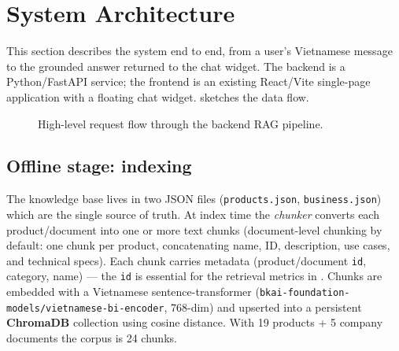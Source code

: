 \section{System Architecture}
\label{sec:architecture}

This section describes the system end to end, from a user's Vietnamese message
to the grounded answer returned to the chat widget. The backend is a
Python/FastAPI service; the frontend is an existing React/Vite single-page
application with a floating chat widget.  sketches the data flow.

\begin{figure}[H]
\centering
{}
\caption{High-level request flow through the backend RAG pipeline.}
\label{fig:arch}
\end{figure}

\subsection{Offline stage: indexing}
The knowledge base lives in two JSON files (\texttt{products.json},
\texttt{business.json}) which are the single source of truth. At index time the
\emph{chunker} converts each product/document into one or more text chunks
(document-level chunking by default: one chunk per product, concatenating name,
ID, description, use cases, and technical specs). Each chunk carries metadata
(product/document \texttt{id}, category, name) --- the \texttt{id} is essential
for the retrieval metrics in . Chunks are embedded with a
Vietnamese sentence-transformer (\texttt{bkai-foundation-models/vietnamese-bi-encoder}, 768-dim)
and upserted into a persistent \textbf{ChromaDB} collection using cosine
distance. With 19 products + 5 company documents the corpus is 24 chunks.

